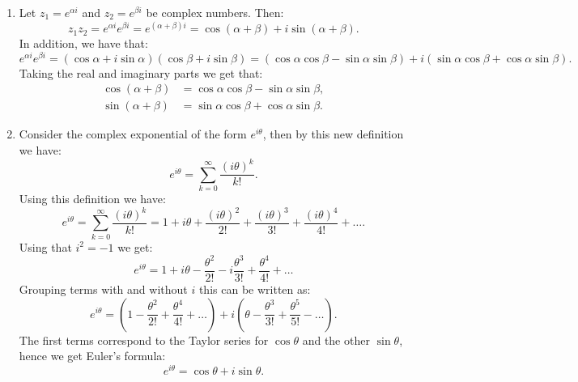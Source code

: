 \begin{enumerate}
\item Let $z_{1}=e^{\alpha i}$ and $z_{2}=e^{\beta i}$ be complex numbers. Then:
$$z_{1}z_{2}=e^{\alpha i}e^{\beta i}=e^{(\alpha+\beta)i}=\cos(\alpha+\beta)+i\sin(\alpha+\beta).$$
In addition, we have that:
$$e^{\alpha i}e^{\beta i}=(\cos\alpha+i\sin\alpha)(\cos\beta+i\sin\beta)=(\cos\alpha\cos\beta-\sin\alpha\sin\beta)+i(\sin\alpha\cos\beta+\cos\alpha\sin\beta).$$
Taking the real and imaginary parts we get that:
\begin{align*}
    \cos(\alpha+\beta) &=\cos\alpha\cos\beta-\sin\alpha\sin\beta, \\
    \sin(\alpha+\beta) &=\sin\alpha\cos\beta+\cos\alpha\sin\beta.
\end{align*}

\item Consider the complex exponential of the form $e^{i\theta}$, then by this new definition we have:
$$e^{i\theta}=\sum_{k=0}^{\infty}\frac{(i\theta)^{k}}{k!}.$$
Using this definition we have:
$$e^{i\theta}=\sum_{k=0}^{\infty}\frac{(i\theta)^{k}}{k!}=1 + i\theta + \frac{(i\theta)^{2}}{2!} + \frac{(i\theta)^{3}}{3!} + \frac{(i\theta)^{4}}{4!} + \hdots.$$
Using that $i^{2}=-1$ we get:
$$e^{i\theta}=1+i\theta-\frac{\theta^{2}}{2!}-i\frac{\theta^{3}}{3!}+\frac{\theta^{4}}{4!}+\hdots$$
Grouping terms with and without $i$ this can be written as:
$$e^{i\theta}=(1-\frac{\theta^{2}}{2!}+\frac{\theta^{4}}{4!}+\hdots)+i(\theta-\frac{\theta^{3}}{3!}+\frac{\theta^{5}}{5!}-\hdots).$$
The first terms correspond to the Taylor series for $\cos \theta$ and the other $\sin \theta$, hence we get Euler's formula:
$$e^{i\theta}=\cos\theta+i\sin\theta.$$

\end{enumerate}